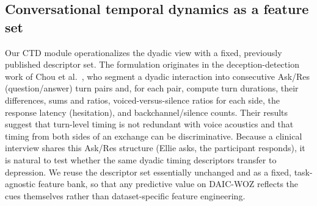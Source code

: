 \documentclass{article}
\begin{document}

\subsection{Conversational temporal dynamics as a feature set}
Our CTD module operationalizes the dyadic view with a fixed, previously published descriptor set. 
The formulation originates in the deception-detection work of Chou et al.~\cite{chou2019joint,chou2021automatic}, who segment a dyadic interaction into consecutive Ask/Res (question/answer) turn pairs and, for each pair, compute turn durations, their differences, sums and ratios, voiced-versus-silence ratios for each side, the response latency (hesitation), and backchannel/silence counts. 
Their results suggest that turn-level timing is not redundant with voice acoustics and that timing from both sides of an exchange can be discriminative. Because a clinical interview shares this Ask/Res structure (Ellie asks, the participant responds), it is natural to test whether the same dyadic timing descriptors transfer to depression. We reuse the descriptor set essentially unchanged and as a fixed, task-agnostic feature bank, so that any predictive value on DAIC-WOZ reflects the cues themselves rather than dataset-specific feature engineering.
\end{document}
